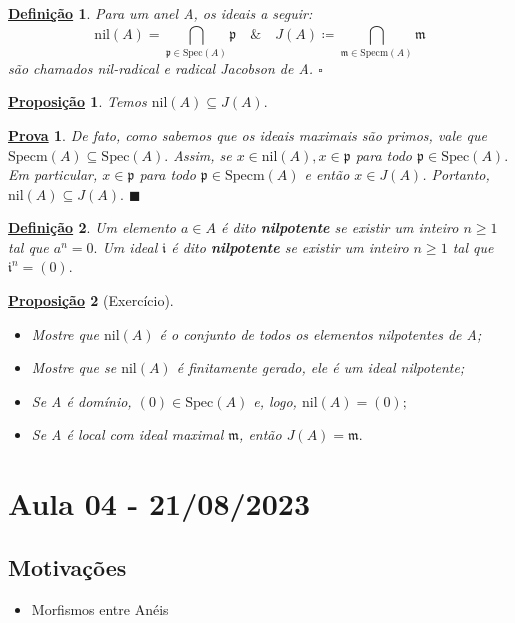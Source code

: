 \documentclass{article}
\newtheorem*{def*}{\underline{Defini\c c\~ao}}
\newtheorem*{prop*}{\underline{Proposi\c c\~ao}}
\newtheorem*{proof*}{\underline{Prova}}
\renewcommand\qedsymbol{$\blacksquare$}
\begin{document}
\begin{def*}
  Para um anel A, os ideais a seguir:
  \[
    \mathrm{nil}(A) = \bigcap_{\mathfrak{p}\in \mathrm{Spec}(A)}^{}{\mathfrak{p}}\quad \& \quad J(A)\coloneqq \bigcap_{\mathfrak{m}\in \mathrm{Specm}(A)}^{}{\mathfrak{m}}
  \]
  são chamados nil-radical e radical Jacobson de A. \(\square\)
\end{def*}
\begin{prop*}
  Temos \(\mathrm{nil}(A) \subseteq{J(A)}.\)
\end{prop*}
\begin{proof*}
  De fato, como sabemos que os ideais maximais são primos, vale que \(\mathrm{Specm}(A)\subseteq{\mathrm{Spec}(A)}.\) Assim, se
 \(x\in \mathrm{nil}(A),x\in \mathfrak{p}\) para todo \(\mathfrak{p}\in \mathrm{Spec}(A).\) Em particular, \(x\in \mathfrak{p}\) para todo \(\mathfrak{p}\in \mathrm{Specm}(A)\)
 e então \(x\in J(A)\). Portanto, \(\mathrm{nil}(A) \subseteq{J(A)}.\) \qedsymbol
\end{proof*}
\begin{def*}
  Um elemento \(a\in A\) é dito \textbf{nilpotente} se existir um inteiro \(n\geq 1\) tal que \(a^{n} = 0.\) Um ideal
 \(\mathfrak{i}\) é dito \textbf{nilpotente} se existir um inteiro \(n\geq 1\) tal que \(\mathfrak{i}^{n} = (0).\)
\end{def*}
\begin{prop*}[Exercício]
 \begin{itemize}
  \item[1)] Mostre que \(\mathrm{nil}(A)\) é o conjunto de todos os elementos nilpotentes de A;
  \item[2)] Mostre que se \(\mathrm{nil}(A)\) é finitamente gerado, ele é um ideal nilpotente;
  \item[3)] Se A é domínio, \((0)\in \mathrm{Spec}(A)\) e, logo, \(\mathrm{nil}(A) = (0);\)
  \item[4)] Se A é local com ideal maximal \(\mathfrak{m}\), então \(J(A) = \mathfrak{m}.\)
 \end{itemize}  
\end{prop*}
\newpage

\section{Aula 04 - 21/08/2023}
\subsection{Motivações}
\begin{itemize}
  \item Morfismos entre Anéis
\end{itemize}
\end{document}
